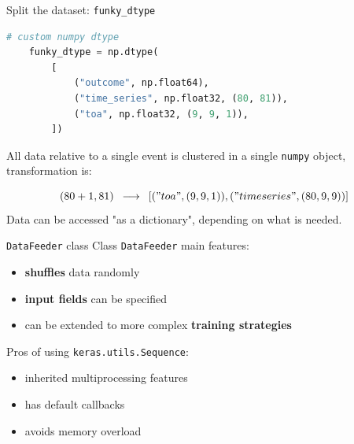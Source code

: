 \documentclass{beamer}
\begin{document}
\begin{frame}[fragile]{Split the dataset: \texttt{funky\_dtype}}

    
    \begin{lstlisting}[language=Python]
    # custom numpy dtype
    funky_dtype = np.dtype(
        [
            ("outcome", np.float64),
            ("time_series", np.float32, (80, 81)),
            ("toa", np.float32, (9, 9, 1)),
        ])
    \end{lstlisting}
    
    All data relative to a single event is clustered in a single \texttt{numpy} object, transformation is:
    
    \begin{equation*}
        (80 + 1, 81)\,\,\, \longrightarrow \,\,\, [("toa", (9, 9, 1)), ("timeseries", (80, 9,9))]
    \end{equation*}
    Data can be accessed "as a dictionary", depending on what is needed.

\end{frame}


\begin{frame}{\texttt{DataFeeder} class}
    Class \texttt{DataFeeder} main features:
    \vfill
    \begin{itemize}
        \item[\textbullet] \textbf{shuffles} data randomly
        \item[\textbullet] \textbf{input fields} can be specified 
        \item[\textbullet] can be extended to more complex \textbf{training strategies}
    \end{itemize}
    

    \vfill

    Pros of using \texttt{keras.utils.Sequence}:
    \vfill
    \begin{itemize}
        \item[\textbullet] inherited multiprocessing features
        \item[\textbullet] has default callbacks
        \item[\textbullet] avoids memory overload
    \end{itemize}
    
\end{frame}
\end{document}
